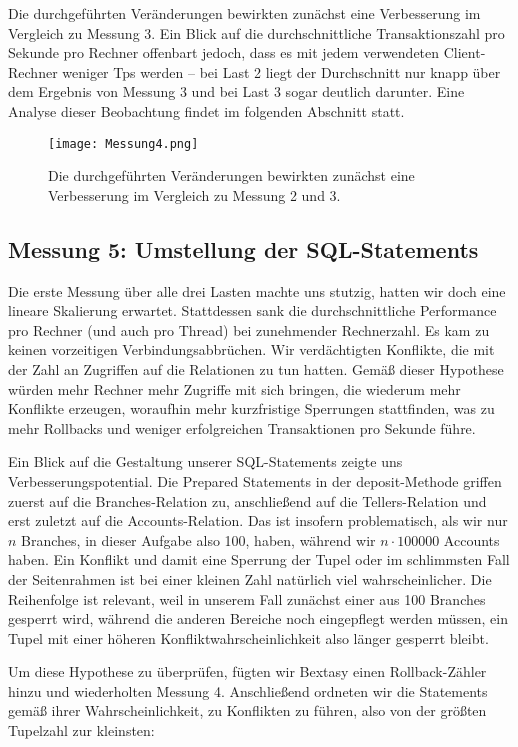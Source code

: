 \documentclass[a4paper, bibliography=totoc, 12pt]{scrartcl}
\begin{document}
	\noindent
	Die durchgeführten Veränderungen bewirkten zunächst eine Verbesserung im Vergleich zu Messung 3. Ein Blick auf die durchschnittliche Transaktionszahl pro Sekunde pro Rechner offenbart jedoch, dass es mit jedem verwendeten Client-Rechner weniger Tps werden -- bei Last 2 liegt der Durchschnitt nur knapp über dem Ergebnis von Messung 3 und bei Last 3 sogar deutlich darunter. Eine Analyse dieser Beobachtung findet im folgenden Abschnitt statt.
	
	\begin{figure}[h]
	\texttt{[image: Messung4.png]}
	\caption{	Die durchgeführten Veränderungen bewirkten zunächst eine Verbesserung im Vergleich zu Messung 2 und 3.}
	\end{figure}

	\subsection{Messung 5: Umstellung der SQL-Statements}
	Die erste Messung über alle drei Lasten machte uns stutzig, hatten wir doch eine lineare Skalierung erwartet. Stattdessen sank die durchschnittliche Performance pro Rechner (und auch pro Thread) bei zunehmender Rechnerzahl. Es kam zu keinen vorzeitigen Verbindungsabbrüchen.
	Wir verdächtigten Konflikte, die mit der Zahl an Zugriffen auf die Relationen zu tun hatten. Gemäß dieser Hypothese würden mehr Rechner mehr Zugriffe mit sich bringen, die wiederum mehr Konflikte erzeugen, woraufhin mehr kurzfristige Sperrungen stattfinden, was zu mehr Rollbacks und weniger erfolgreichen Transaktionen pro Sekunde führe.
	
	Ein Blick auf die Gestaltung unserer SQL-Statements zeigte uns Verbesserungspotential. Die Prepared Statements in der deposit-Methode griffen zuerst auf die Branches-Relation zu, anschließend auf die Tellers-Relation und erst zuletzt auf die Accounts-Relation. Das ist insofern problematisch, als wir nur $n$ Branches, in dieser Aufgabe also 100, haben, während wir $n \cdot 100000$ Accounts haben. Ein Konflikt und damit eine Sperrung der Tupel oder im schlimmsten Fall der Seitenrahmen ist bei einer kleinen Zahl natürlich viel wahrscheinlicher. Die Reihenfolge ist relevant, weil in unserem Fall zunächst einer aus 100 Branches gesperrt wird, während die anderen Bereiche noch eingepflegt werden müssen, ein Tupel mit einer höheren Konfliktwahrscheinlichkeit also länger gesperrt bleibt. 
	
	Um diese Hypothese zu überprüfen, fügten wir Bextasy einen Rollback-Zähler hinzu und wiederholten Messung 4. Anschließend ordneten wir die Statements gemäß ihrer Wahrscheinlichkeit, zu Konflikten zu führen, also von der größten Tupelzahl zur kleinsten:
	\vspace{0.5cm}
	
\end{document}
